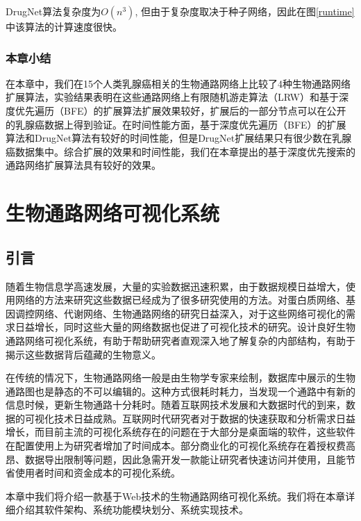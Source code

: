 DrugNet算法复杂度为$O(n^{3})$, 但由于复杂度取决于种子网络，因此在图\ref{runtime}中该算法的计算速度很快。

\subsection{本章小结}
在本章中，我们在15个人类乳腺癌相关的生物通路网络上比较了4种生物通路网络扩展算法，实验结果表明在这些通路网络上有限随机游走算法（LRW）和基于深度优先遍历（BFE）的扩展算法扩展效果较好，扩展后的一部分节点可以在公开的乳腺癌数据上得到验证。在时间性能方面，基于深度优先遍历（BFE）的扩展算法和DrugNet算法有较好的时间性能，但是DrugNet扩展结果只有很少数在乳腺癌数据集中。综合扩展的效果和时间性能，我们在本章提出的基于深度优先搜索的通路网络扩展算法具有较好的效果。




\chapter{生物通路网络可视化系统}
\section{引言}
随着生物信息学高速发展，大量的实验数据迅速积累，由于数据规模日益增大，使用网络的方法来研究这些数据已经成为了很多研究使用的方法。对蛋白质网络、基因调控网络、代谢网络、生物通路网络的研究日益深入，对于这些网络可视化的需求日益增长，同时这些大量的网络数据也促进了可视化技术的研究。设计良好生物通路网络可视化系统，有助于帮助研究者直观深入地了解复杂的内部结构，有助于揭示这些数据背后蕴藏的生物意义。

在传统的情况下，生物通路网络一般是由生物学专家来绘制，数据库中展示的生物通路图也是静态的不可以编辑的。这种方式很耗时耗力，当发现一个通路中有新的信息时候，更新生物通路十分耗时。随着互联网技术发展和大数据时代的到来，数据的可视化技术日益成熟。互联网时代研究者对于数据的快速获取和分析需求日益增长，而目前主流的可视化系统存在的问题在于大部分是桌面端的软件，这些软件在配置使用上为研究者增加了时间成本。部分商业化的可视化系统存在着授权费高昂、数据导出限制等问题，因此急需开发一款能让研究者快速访问并使用，且能节省使用者时间和资金成本的可视化系统。

本章中我们将介绍一款基于Web技术的生物通路网络可视化系统。我们将在本章详细介绍其软件架构、系统功能模块划分、系统实现技术。

